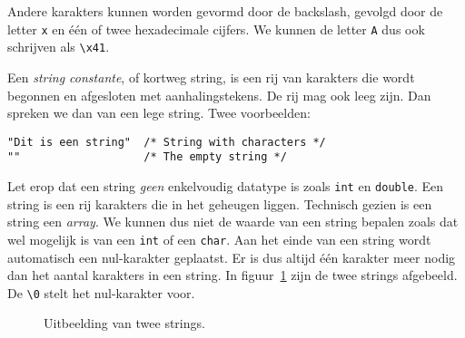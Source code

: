 
Andere karakters kunnen worden gevormd door de backslash, gevolgd door de letter \texttt{x} en één of twee hexadecimale cijfers. We kunnen de letter \texttt{A} dus ook schrijven als \texttt{\textquotesingle\textbackslash x41\textquotesingle}.

Een \textsl{string constante}, of kortweg string, is een rij van karakters die wordt begonnen en afgesloten met aanhalingstekens. De rij mag ook leeg zijn. Dan spreken we dan van een lege string. Twee voorbeelden:

\begin{lstlisting}[style=lstoneline]
"Dit is een string"  /* String with characters */
""                   /* The empty string */
\end{lstlisting}

Let erop dat een string \textsl{geen} enkelvoudig datatype is zoals \texttt{int} en \texttt{double}. Een string is een rij karakters die in het geheugen liggen. Technisch gezien is een string een \textsl{array}. We kunnen dus niet de waarde van een string bepalen zoals dat wel mogelijk is van een \texttt{int} of een \texttt{char}. Aan het einde van een string wordt automatisch een nul-karakter geplaatst. Er is dus altijd één karakter meer nodig dan het aantal karakters in een string. In figuur~\ref{fig:varstrings} zijn de twee strings afgebeeld. De \texttt{\textquotesingle\textbackslash0\textquotesingle} stelt het nul-karakter voor.

\begin{figure}[!ht]
\centering
{}
\caption{Uitbeelding van twee strings.}
\label{fig:varstrings}
\end{figure}

